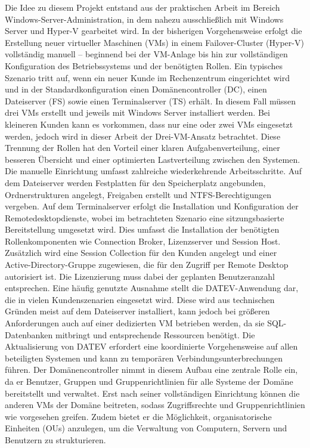 \documentclass[conference]{IEEEtran}
\begin{document}
Die Idee zu diesem Projekt entstand aus der praktischen Arbeit im Bereich Windows-Server-Administration, in dem nahezu ausschließlich mit Windows Server und Hyper-V gearbeitet wird.
In der bisherigen Vorgehensweise erfolgt die Erstellung neuer virtueller Maschinen (VMs) in einem Failover-Cluster (Hyper-V) vollständig manuell – beginnend bei der VM-Anlage bis hin zur vollständigen Konfiguration des Betriebssystems und der benötigten Rollen.
Ein typisches Szenario tritt auf, wenn ein neuer Kunde im Rechenzentrum eingerichtet wird und in der Standardkonfiguration einen Domänencontroller (DC), einen Dateiserver (FS) sowie einen Terminalserver (TS) erhält.
In diesem Fall müssen drei VMs erstellt und jeweils mit Windows Server installiert werden.
Bei kleineren Kunden kann es vorkommen, dass nur eine oder zwei VMs eingesetzt werden, jedoch wird in dieser Arbeit der Drei-VM-Ansatz betrachtet.
Diese Trennung der Rollen hat den Vorteil einer klaren Aufgabenverteilung, einer besseren Übersicht und einer optimierten Lastverteilung zwischen den Systemen.
Die manuelle Einrichtung umfasst zahlreiche wiederkehrende Arbeitsschritte.
Auf dem Dateiserver werden Festplatten für den Speicherplatz angebunden, Ordnerstrukturen angelegt, Freigaben erstellt und NTFS-Berechtigungen vergeben.
Auf dem Terminalserver erfolgt die Installation und Konfiguration der Remotedesktopdienste, wobei im betrachteten Szenario eine sitzungsbasierte Bereitstellung umgesetzt wird.
Dies umfasst die Installation der benötigten Rollenkomponenten wie Connection Broker, Lizenzserver und Session Host.
Zusätzlich wird eine Session Collection für den Kunden angelegt und einer Active-Directory-Gruppe zugewiesen, die für den Zugriff per Remote Desktop autorisiert ist.
Die Lizenzierung muss dabei der geplanten Benutzeranzahl entsprechen.
Eine häufig genutzte Ausnahme stellt die DATEV-Anwendung dar, die in vielen Kundenszenarien eingesetzt wird.
Diese wird aus technischen Gründen meist auf dem Dateiserver installiert, kann jedoch bei größeren Anforderungen auch auf einer dedizierten VM betrieben werden, da sie SQL-Datenbanken mitbringt und entsprechende Ressourcen benötigt.
Die Aktualisierung von DATEV erfordert eine koordinierte Vorgehensweise auf allen beteiligten Systemen und kann zu temporären Verbindungsunterbrechungen führen.
Der Domänencontroller nimmt in diesem Aufbau eine zentrale Rolle ein, da er Benutzer, Gruppen und Gruppenrichtlinien für alle Systeme der Domäne bereitstellt und verwaltet.
Erst nach seiner vollständigen Einrichtung können die anderen VMs der Domäne beitreten, sodass Zugriffsrechte und Gruppenrichtlinien wie vorgesehen greifen.
Zudem bietet er die Möglichkeit, organisatorische Einheiten (OUs) anzulegen, um die Verwaltung von Computern, Servern und Benutzern zu strukturieren.
\end{document}
